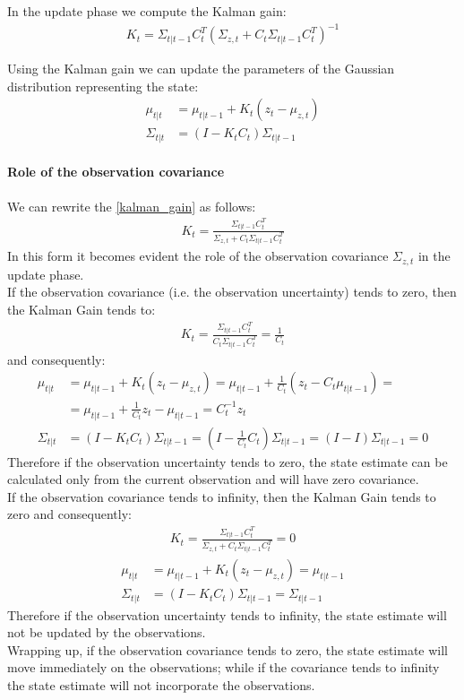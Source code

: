 In the update phase we compute the Kalman gain:
\begin{align}
	K_t = \Sigma_{t|t-1} C_t^T (\Sigma_{z,t} + C_t \Sigma_{t|t-1} C_t^T)^{-1}\label{kalman_gain}
\end{align}

Using the Kalman gain we can update the parameters of the Gaussian distribution representing the state:
\begin{align}
	\mu_{t|t} &= \mu_{t|t-1} + K_t (z_t - \mu_{z,t})\\
	\Sigma_{t|t} &= (I - K_t C_t) \Sigma_{t|t-1}
\end{align}

\paragraph{Role of the observation covariance}
We can rewrite the \ref{kalman_gain} as follows:
\begin{gather*}
	K_t = \frac{\Sigma_{t|t-1} C_t^T}{\Sigma_{z,t} + C_t \Sigma_{t|t-1} C_t^T}
\end{gather*}
In this form it becomes evident the role of the observation covariance $\Sigma_{z,t}$ in the update phase.\\

If the observation covariance (i.e. the observation uncertainty) tends to zero, then the Kalman Gain tends to:
\begin{gather*}
	K_t = \frac{\Sigma_{t|t-1} C_t^T}{C_t \Sigma_{t|t-1} C_t^T} = \frac{1}{C_t}	
\end{gather*}
and consequently:
\begin{align*}
	\mu_{t|t} &= \mu_{t|t-1} + K_t (z_t - \mu_{z,t}) = \mu_{t|t-1} + \frac{1}{C_t} (z_t - C_t \mu_{t|t-1}) =\nonumber\\
			&= \mu_{t|t-1} + \frac{1}{C_t} z_t - \mu_{t|t-1} = C_t^{-1}z_t\\
	\Sigma_{t|t} &= (I - K_t C_t) \Sigma_{t|t-1} = (I - \frac{1}{C_t} C_t) \Sigma_{t|t-1} = (I - I) \Sigma_{t|t-1} = 0
\end{align*}
Therefore if the observation uncertainty tends to zero, the state estimate can be calculated only from the current observation and will have zero covariance.\\

If the observation covariance tends to infinity, then the Kalman Gain tends to zero and consequently:
\begin{gather*}
	K_t = \frac{\Sigma_{t|t-1} C_t^T}{\Sigma_{z,t} + C_t \Sigma_{t|t-1} C_t^T} = 0
\end{gather*}
\begin{align*}
	\mu_{t|t} &= \mu_{t|t-1} + K_t (z_t - \mu_{z,t}) = \mu_{t|t-1}\\
	\Sigma_{t|t} &= (I - K_t C_t) \Sigma_{t|t-1} = \Sigma_{t|t-1}
\end{align*}
Therefore if the observation uncertainty tends to infinity, the state estimate will not be updated by the observations.\\

Wrapping up, if the observation covariance tends to zero, the state estimate will move immediately on the observations; while if the covariance tends to infinity the state estimate will not incorporate the observations.

